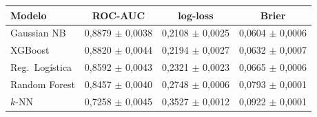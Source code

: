\small\setlength{\tabcolsep}{4pt}
\begin{tabular}{lccc}
\toprule
Modelo & ROC-AUC & log-loss & Brier \\
\midrule
Gaussian NB & 0{,}8879 $\pm$ 0{,}0038 & 0{,}2108 $\pm$ 0{,}0025 & 0{,}0604 $\pm$ 0{,}0006 \\
XGBoost & 0{,}8820 $\pm$ 0{,}0044 & 0{,}2194 $\pm$ 0{,}0027 & 0{,}0632 $\pm$ 0{,}0007 \\
Reg.\ Logística & 0{,}8592 $\pm$ 0{,}0043 & 0{,}2321 $\pm$ 0{,}0023 & 0{,}0665 $\pm$ 0{,}0006 \\
Random Forest & 0{,}8457 $\pm$ 0{,}0040 & 0{,}2748 $\pm$ 0{,}0006 & 0{,}0793 $\pm$ 0{,}0001 \\
$k$-NN & 0{,}7258 $\pm$ 0{,}0045 & 0{,}3527 $\pm$ 0{,}0012 & 0{,}0922 $\pm$ 0{,}0001 \\
\bottomrule
\end{tabular}